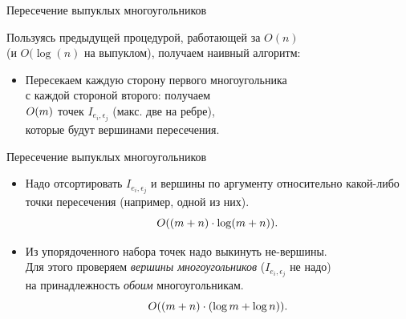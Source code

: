     \begin{frame}{Пересечение выпуклых многоугольников}

        Пользуясь предыдущей процедурой, работающей за $O(n)$ \\ (и $O(\log(n)$ на выпуклом), получаем наивный алгоритм:

        \begin{itemize}
		\item Пересекаем каждую сторону первого многоугольника \\ с каждой стороной второго: получаем \\ \(O \lr*{m} \) точек \(I_{e_i, \epsilon_j}\) (макс. две на ребре), \\ которые будут вершинами пересечения.
		\end{itemize} \end{frame}

\begin{frame}{Пересечение выпуклых многоугольников}
		\begin{itemize}
		\item Надо отсортировать \(I_{e_i, \epsilon_j}\) и вершины по аргументу относительно какой-либо точки пересечения (например, одной из них).
		\[O \lr*{\lr*{m+n} \cdot \log \lr*{m+n}} .\]

		\item Из упорядоченного набора точек надо выкинуть не-вершины.\\
		Для этого проверяем {\it вершины многоугольников} (\(I_{e_i, \epsilon_j}\) не надо)\\
		на принадлежность {\it обоим} многоугольникам.
		\[O \lr*{\lr*{m+n} \cdot \lr*{\log m + \log n}} .\]
        \end{itemize}
    \end{frame}

